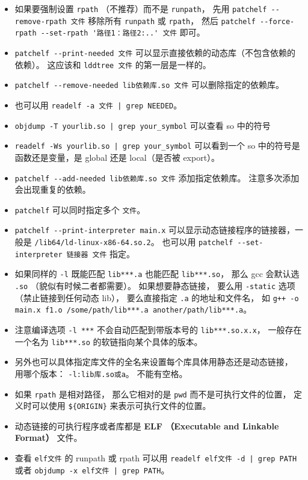 \begin{itemize}
\item 如果要强制设置 \verb`rpath` （不推荐）而不是 \verb`runpath`， 先用 \verb`patchelf --remove-rpath 文件` 移除所有 \verb`runpath` 或 \verb`rpath`， 然后 \verb`patchelf --force-rpath --set-rpath '路径1：路径2:..' 文件` 即可。
\item \verb`patchelf --print-needed 文件` 可以显示直接依赖的动态库（不包含依赖的依赖）。 这应该和 \verb`lddtree 文件` 的第一层是一样的。
\item \verb`patchelf --remove-needed lib依赖库.so 文件` 可以删除指定的依赖库。
\item 也可以用 \verb`readelf -a 文件 | grep NEEDED`。
\item \verb`objdump -T yourlib.so | grep your_symbol` 可以查看 so 中的符号
\item \verb`readelf -Ws yourlib.so | grep your_symbol`  可以看到一个 so 中的符号是函数还是变量，是 global 还是 local（是否被 export）。
\item \verb`patchelf --add-needed lib依赖库.so 文件` 添加指定依赖库。 注意多次添加会出现重复的依赖。
\item \verb`patchelf` 可以同时指定多个 \verb`文件`。
\item \verb`patchelf --print-interpreter main.x` 可以显示动态链接程序的链接器，一般是 \verb`/lib64/ld-linux-x86-64.so.2`。 也可以用 \verb`patchelf --set-interpreter 链接器 文件` 指定。 
\item 如果同样的 \verb`-l` 既能匹配 \verb`lib***.a` 也能匹配 \verb`lib***.so`， 那么 gcc 会默认选 \verb`.so` （貌似有时候二者都需要）。 如果想要静态链接， 要么用 \verb`-static` 选项（禁止链接到任何动态 lib）， 要么直接指定 \verb`.a` 的地址和文件名， 如 \verb`g++ -o main.x f1.o /some/path/lib***.a another/path/lib***.a`。
\item 注意编译选项 \verb`-l ***` 不会自动匹配到带版本号的 \verb`lib***.so.x.x`， 一般存在一个名为 \verb`lib***.so` 的软链指向某个具体的版本。
\item 另外也可以具体指定库文件的全名来设置每个库具体用静态还是动态链接， 用哪个版本： \verb`-l:lib库.so或a`。 不能有空格。
\item 如果 \verb`rpath` 是相对路径， 那么它相对的是 \verb`pwd` 而不是可执行文件的位置， 定义时可以使用 \verb`${ORIGIN}` 来表示可执行文件的位置。
\item 动态链接的可执行程序或者库都是 \textbf{ELF （Executable and Linkable Format）} 文件。
\item 查看 \verb`elf文件` 的 runpath 或 rpath 可以用 \verb`readelf elf文件 -d | grep PATH` 或者 \verb`objdump -x elf文件 | grep PATH`。

\end{itemize}
